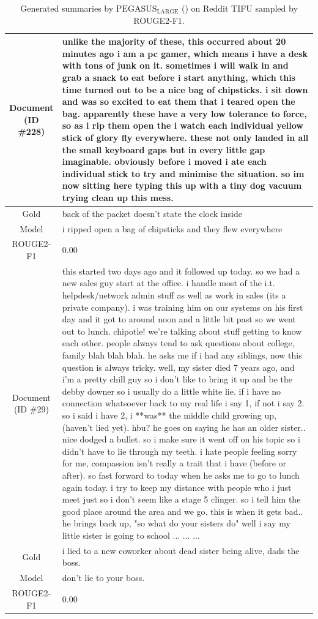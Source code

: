 \begin{table}[bth!]
\begin{tabular}{c|p{}}
\makecell{Document\\(ID \#228)} & 
unlike the majority of these, this occurred about 20 minutes ago i am a pc gamer, which means i have a desk with tons of junk on it. sometimes i will walk in and grab a snack to eat before i start anything, which this time turned out to be a nice bag of chipsticks. i sit down and was so excited to eat them that i teared open the bag. apparently these have a very low tolerance to force, so as i rip them open the i watch each individual yellow stick of glory fly everywhere. these not only landed in all the small keyboard gaps but in every little gap imaginable. obviously before i moved i ate each individual stick to try and minimise the situation. so im now sitting here typing this up with a tiny dog vacuum trying clean up this mess.
\\ \hline
Gold & 
back of the packet doesn't state the clock inside
\\ \hline
Model & 
i ripped open a bag of chipsticks and they flew everywhere
\\ \hline
ROUGE2-F1 & 
0.00
\\ \hline
\makecell{Document\\(ID \#29)} & 
this started two days ago and it followed up today. so we had a new sales guy start at the office. i handle most of the i.t. helpdesk/network admin stuff as well as work in sales (its a private company). i was training him on our systems on his first day and it got to around noon and a little bit past so we went out to lunch. chipotle! we're talking about stuff getting to know each other. people always tend to ask questions about college, family blah blah blah. he asks me if i had any siblings, now this question is always tricky. well, my sister died 7 years ago, and i'm a pretty chill guy so i don't like to bring it up and be the debby downer so i usually do a little white lie. if i have no connection whatsoever back to my real life i say 1, if not i say 2. so i said i have 2, i **was** the middle child growing up, (haven't lied yet). hbu? he goes on saying he has an older sister.. nice dodged a bullet. so i make sure it went off on his topic so i didn't have to lie through my teeth. i hate people feeling sorry for me, compassion isn't really a trait that i have (before or after). so fast forward to today when he asks me to go to lunch again today. i try to keep my distance with people who i just meet just so i don't seem like a stage 5 clinger. so i tell him the good place around the area and we go. this is when it gets bad.. he brings back up, "so what do your sisters do" well i say my little sister is going to school ... ... ... 
\\ \hline
Gold & 
i lied to a new coworker about dead sister being alive, dads the boss.
\\ \hline
Model & 
don't lie to your boss.
\\ \hline
ROUGE2-F1 & 
0.00
\\ \hline
\end{tabular}
\caption{Generated summaries by $\text{PEGASUS}_{\text{LARGE}}$ (\gnews) on Reddit TIFU sampled by ROUGE2-F1.}
\end{table}
